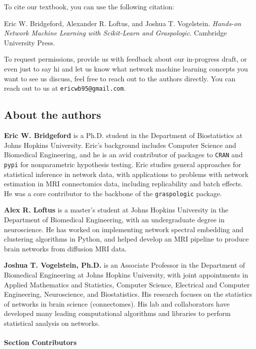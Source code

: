 To cite our textbook, you can use the following citation: 

Eric W. Bridgeford, Alexander R. Loftus, and Joshua T. Vogelstein. \emph{Hands-on Network Machine Learning with Scikit-Learn and Graspologic}. Cambridge University Press.

To request permissions, provide us with feedback about our in-progress draft, or even just to say hi and let us know what network machine learning concepts you want to see us discuss, feel free to reach out to the authors directly. You can reach out to us at \texttt{ericwb95@gmail.com}.

\subsection*{About the authors}

\textbf{Eric W. Bridgeford} is a Ph.D. student in the Department of Biostatistics at Johns Hopkins University. Eric’s background includes Computer Science and Biomedical Engineering, and he is an avid contributor of packages to \texttt{CRAN} and \texttt{pypi} for nonparametric hypothesis testing. Eric studies general approaches for statistical inference in network data, with applications to problems with network estimation in MRI connectomics data, including replicability and batch effects. He was a core contributor to the backbone of the \texttt{graspologic} package.

\noindent\textbf{Alex R. Loftus} is a master’s student at Johns Hopkins University in the Department of Biomedical Engineering, with an undergraduate degree in neuroscience. He has worked on implementing network spectral embedding and clustering algorithms in Python, and helped develop an MRI pipeline to produce brain networks from diffusion MRI data.

\noindent\textbf{Joshua T. Vogelstein, Ph.D.} is an Associate Professor in the Department of Biomedical Engineering at Johns Hopkins University, with joint appointments in Applied Mathematics and Statistics, Computer Science, Electrical and Computer Engineering, Neuroscience, and Biostatistics. His research focuses on the statistics of networks in brain science (connectomes). His lab and collaborators have developed many leading computational algorithms and libraries to perform statistical analysis on networks.

\paragraph{Section Contributors}

